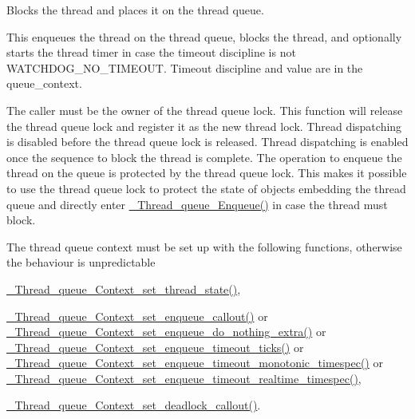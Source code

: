 Blocks the thread and places it on the thread queue. 

This enqueues the thread on the thread queue, blocks the thread, and optionally starts the thread timer in case the timeout discipline is not W\+A\+T\+C\+H\+D\+O\+G\+\_\+\+N\+O\+\_\+\+T\+I\+M\+E\+O\+UT. Timeout discipline and value are in the queue\+\_\+context.

The caller must be the owner of the thread queue lock. This function will release the thread queue lock and register it as the new thread lock. Thread dispatching is disabled before the thread queue lock is released. Thread dispatching is enabled once the sequence to block the thread is complete. The operation to enqueue the thread on the queue is protected by the thread queue lock. This makes it possible to use the thread queue lock to protect the state of objects embedding the thread queue and directly enter \mbox{\hyperlink{group__RTEMSScoreThreadQueue_ga4992b40810f6d287c832bdad240dbc90}{\+\_\+\+Thread\+\_\+queue\+\_\+\+Enqueue()}} in case the thread must block.

The thread queue context must be set up with the following functions, otherwise the behaviour is unpredictable


\begin{DoxyItemize}
\item \mbox{\hyperlink{group__RTEMSScoreThreadQueue_gab31678d367077d484797bc9c4d97574e}{\+\_\+\+Thread\+\_\+queue\+\_\+\+Context\+\_\+set\+\_\+thread\+\_\+state()}},
\item \mbox{\hyperlink{group__RTEMSScoreThreadQueue_gae3eded5964733b953ab0a461a9d82f5d}{\+\_\+\+Thread\+\_\+queue\+\_\+\+Context\+\_\+set\+\_\+enqueue\+\_\+callout()}} or \mbox{\hyperlink{group__RTEMSScoreThreadQueue_gaa7142c86d5677c5c5b0f993beecdc712}{\+\_\+\+Thread\+\_\+queue\+\_\+\+Context\+\_\+set\+\_\+enqueue\+\_\+do\+\_\+nothing\+\_\+extra()}} or \mbox{\hyperlink{group__RTEMSScoreThreadQueue_ga539935c21bc9e51bd27d64eb8f2ea26c}{\+\_\+\+Thread\+\_\+queue\+\_\+\+Context\+\_\+set\+\_\+enqueue\+\_\+timeout\+\_\+ticks()}} or \mbox{\hyperlink{group__RTEMSScoreThreadQueue_ga3094c6721a6db2468884cfb502263d36}{\+\_\+\+Thread\+\_\+queue\+\_\+\+Context\+\_\+set\+\_\+enqueue\+\_\+timeout\+\_\+monotonic\+\_\+timespec()}} or \mbox{\hyperlink{group__RTEMSScoreThreadQueue_gab148af32965cdef1887db52409f7ee86}{\+\_\+\+Thread\+\_\+queue\+\_\+\+Context\+\_\+set\+\_\+enqueue\+\_\+timeout\+\_\+realtime\+\_\+timespec()}},
\item \mbox{\hyperlink{group__RTEMSScoreThreadQueue_gab024e7369bc091e53e7bb04ed8ebfb61}{\+\_\+\+Thread\+\_\+queue\+\_\+\+Context\+\_\+set\+\_\+deadlock\+\_\+callout()}}.
\end{DoxyItemize}



